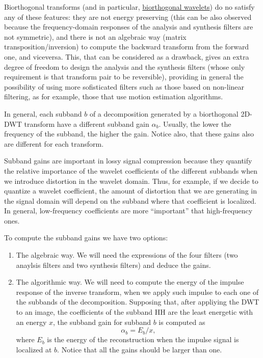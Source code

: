 Biorthogonal transforms (and in particular,
\href{https://en.wikipedia.org/wiki/Biorthogonal_wavelet}{biorthogonal
  wavelets}) do no satisfy any of these features: they are not energy
preserving (this can be also observed because the frequency-domain
responses of the analysis and synthesis filters are not symmetric),
and there is not an algebraic way (matrix transposition/inversion) to
compute the backward transform from the forward one, and
viceversa. This, that can be considered as a drawback, gives an extra
degree of freedom to design the analysis and the synthesis filters
(whose only requirement is that transform pair to be reversible),
providing in general the possibility of using more sofisticated
filters such as those based on non-linear filtering, as for example,
those that use motion estimation algorithms.

In general, each subband $b$ of a decomposition generated by a
biorthogonal 2D-DWT transform have a different subband gain
$\alpha_b$. Usually, the lower the frequency of the subband, the
higher the gain. Notice also, that these gains also are different for
each transform.

Subband gains are important in lossy signal compression because they
quantify the relative importance of the wavelet coefficients of the
different subbands when we introduce distortion in the wavelet
domain. Thus, for example, if we decide to quantize a wavelet
coefficient, the amount of distortion that we are generating in the
signal domain will depend on the subband where that coefficient is
localized. In general, low-frequency coefficients are more
``important'' that high-frequency ones.

To compute the subband gains we have two options:
\begin{enumerate}
\item The algebraic way. We will need the expressions of the four
  filters (two anaylsis filters and two synthesis filters) and deduce
  the gains.
\item The algorithmic way. We will need to compute the energy of the
  impulse response of the inverse transform, when we apply such
  impulse to each one of the subbands of the decomposition. Supposing
  that, after appliying the DWT to an image, the coefficients of the
  subband HH are the least energetic with an energy $x$, the subband
  gain for subband $b$ is computed as
  \begin{equation}
    \alpha_b = E_b/x,
  \end{equation}
  where $E_b$ is the energy of the reconstruction when the
  impulse signal is localized at $b$. Notice that all the gains should
  be larger than one.
\end{enumerate}

